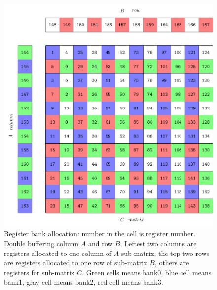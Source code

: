 \documentclass{sig-alternate-05-2015}
\begin{document}
\begin{figure}[htbp]
\begin{center}
\includegraphics[scale=0.45]{reg}
\caption{Register bank allocation: number in the cell is register number. Double buffering column
    $A$ and row $B$. Leftest two columns are registers allocated to one column of $A$ sub-matrix, the
top two rows are registers allocated to one row of sub-matrix $B$, others are registers for
sub-matrix $C$. Green cells means bank0, blue cell means bank1, gray cell means bank2, red cell
means bank3.}
\label{fig:reg}
\end{center}
\end{figure}
\end{document}
